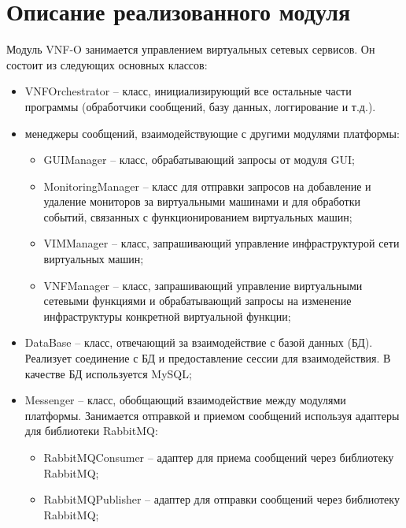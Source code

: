 \documentclass[oneside,final,14pt,a4paper]{extreport}
\begin{document}
\section{Описание реализованного модуля}
\label{sec:developed_module}
Модуль VNF-O занимается управлением виртуальных сетевых сервисов. Он состоит из следующих основных классов:
\begin{itemize}
	\item VNFOrchestrator -- класс, инициализирующий все остальные части программы (обработчики сообщений, базу данных, логгирование и т.д.).
	\item менеджеры сообщений, взаимодействующие с другими модулями платформы:
	\begin{itemize}
		\item GUIManager -- класс, обрабатывающий запросы от модуля GUI;
		\item MonitoringManager -- класс для отправки запросов на добавление и удаление мониторов за виртуальными машинами и для обработки событий, связанных с функционированием виртуальных машин;
		\item VIMManager -- класс, запрашивающий управление инфраструктурой сети виртуальных машин;
		\item VNFManager -- класс, запрашивающий управление виртуальными сетевыми функциями и обрабатывающий запросы на изменение инфраструктуры конкретной виртуальной функции;
	\end{itemize}
	\item DataBase -- класс, отвечающий за взаимодействие с базой данных (БД). Реализует соединение с БД и предоставление сессии для взаимодействия. В качестве БД используется MySQL;
	\item Messenger -- класс, обобщающий взаимодействие между модулями платформы. Занимается отправкой и приемом сообщений используя адаптеры для библиотеки RabbitMQ:
	\begin{itemize}
		\item RabbitMQConsumer -- адаптер для приема сообщений через библиотеку RabbitMQ;
		\item RabbitMQPublisher -- адаптер для отправки сообщений через библиотеку RabbitMQ;
	\end{itemize}
\end{itemize}
\end{document}
